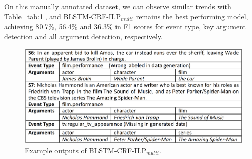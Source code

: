 On this manually annotated dataset, we can observe similar trends with Table~\ref{tab:1}, and BLSTM-CRF-ILP$_{multi}$ remains the best performing model, achieving 80.7\%, 56.4\% and 36.3\% in F1 scores for event type, key argument detection and all argument detection, respectively. 


\begin{figure}[h]
	\centering
	\includegraphics[width=.48\textwidth]{figure3(3).png}
	\caption{Example outputs of BLSTM-CRF-ILP$_{multi}$.\label{fig:1}}
\end{figure}




